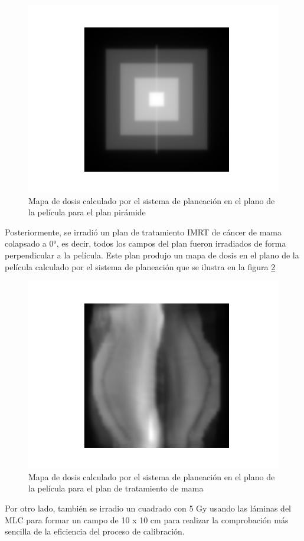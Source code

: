\begin{figure}
	\centering
	\includegraphics[width=0.7\linewidth]{images/piramideTPS.png}
	\caption{Mapa de dosis calculado por el sistema de planeación en el plano de la película para el plan pirámide}
	\label{fig:TPSPiramide}
\end{figure}

Posteriormente, se irradió un plan de tratamiento IMRT de cáncer de mama colapsado a 0°, es decir, todos los campos del plan fueron irradiados de forma perpendicular a la película. Este plan produjo un mapa de dosis en el plano de la película calculado por el sistema de planeación que se ilustra en la figura \ref{fig:TPSMama}\\

\begin{figure}
	\centering
	\includegraphics[width=0.7\linewidth]{images/mamaTPS.png}
	\caption{Mapa de dosis calculado por el sistema de planeación en el plano de la película para el plan de tratamiento de mama}
	\label{fig:TPSMama}
\end{figure}

Por otro lado, también se irradio un cuadrado con 5 Gy usando las láminas del MLC para formar un campo de 10 x 10 cm para realizar la comprobación más sencilla de la eficiencia del proceso de calibración.\\

